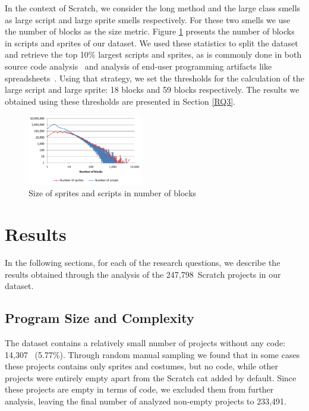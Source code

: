 \documentclass{sig-alternate-05-2015}
\newcommand{\nAnalyzedPrograms}{247,798}
\newcommand{\nemptyPrograms}{14,307}
\newcommand{\nScriptPrograms}{233,491}
\begin{document}
In the context of Scratch, we consider the long method and the large class smells as large script and large sprite smells respectively. For these two smells we use the number of blocks as the size metric. Figure \ref{fig:longmethod} presents the number of blocks in scripts and sprites of our dataset. We used these statistics to split the dataset and retrieve the top 10\% largest scripts and sprites, as is commonly done in both source code analysis~\cite{alves_deriving_2010} and analysis of end-user programming artifacts like spreadsheets~\cite{hermans2015detecting}. Using that strategy, we set the thresholds for the calculation of the large script and large sprite: 18 blocks and 59 blocks respectively. The results we obtained using these thresholds are presented in Section \ref{RQ3}.

\begin{figure}
	\centering
	\includegraphics[width=0.45\textwidth]{fig/charts/13longmethod}
	\vspace{-1em}
	\caption{Size of sprites and scripts in number of blocks}
	\label{fig:longmethod}
\end{figure}

\section{Results}
\label{sec:results}
In the following sections, for each of the research questions, we describe the results obtained through the analysis of the  \nAnalyzedPrograms~Scratch projects in our dataset.

\subsection{Program Size and Complexity}
\label{RQ1}
The dataset contains a relatively small number of projects without any code: \nemptyPrograms~ (5.77\%). Through random manual sampling we found that in some cases these projects contains only sprites and costumes, but no code, while other projects were entirely empty apart from the Scratch cat added by default. Since these projects are empty in terms of code, we excluded them from further analysis, leaving the final number of analyzed non-empty projects to \nScriptPrograms.
\end{document}
